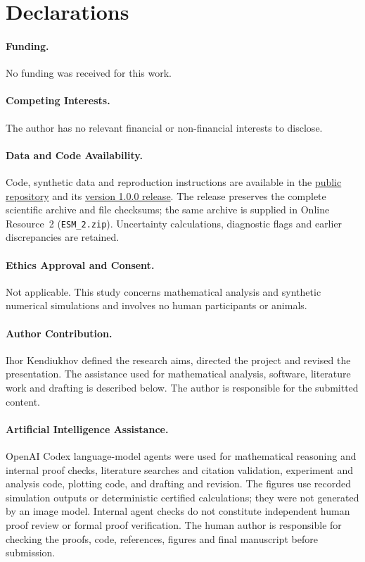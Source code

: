 \section*{Declarations}
\paragraph{Funding.}
No funding was received for this work.
\paragraph{Competing Interests.}
The author has no relevant financial or non-financial interests to disclose.
\paragraph{Data and Code Availability.}
Code, synthetic data and reproduction instructions are available in the
\href{https://github.com/Biodyn-AI/loss-gradient-covariance}{public repository}
and its \href{https://github.com/Biodyn-AI/loss-gradient-covariance/releases/tag/v1.0.0}{version 1.0.0 release}.
The release preserves the complete scientific archive and file checksums;
the same archive is supplied in Online Resource~2 (\texttt{ESM\_2.zip}).
Uncertainty calculations, diagnostic flags and earlier discrepancies are retained.
\paragraph{Ethics Approval and Consent.}
Not applicable. This study concerns mathematical analysis and synthetic
numerical simulations and involves no human participants or animals.
\paragraph{Author Contribution.}
Ihor Kendiukhov defined the research aims, directed the project and revised
the presentation. The assistance used for mathematical analysis, software,
literature work and drafting is described below. The author is responsible
for the submitted content.
\paragraph{Artificial Intelligence Assistance.}
OpenAI Codex language-model agents were used for mathematical reasoning
and internal proof checks, literature searches and citation validation,
experiment and analysis code, plotting code, and drafting and revision.
The figures use recorded simulation outputs or deterministic certified
calculations; they were not generated by an image model. Internal agent
checks do not constitute independent human proof review or formal proof
verification. The human author is responsible for checking the proofs,
code, references, figures and final manuscript before submission.
